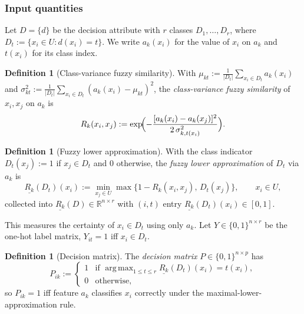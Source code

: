 \documentclass[]{interact}
\theoremstyle{plain}
\theoremstyle{definition}
\newtheorem{definition}[theorem]{Definition}
\theoremstyle{remark}
\newcommand{\R}{\mathbb{R}}
\DeclareMathOperator*{\argmax}{arg\,max}
\begin{document}
\subsubsection{Input quantities}\label{sssec:afrsfcv-inputs}
Let $D=\{d\}$ be the decision attribute with $r$ classes $D_1,\dots,D_r$, where $D_t:=\{x_i\in U:d(x_i)=t\}$. We write $a_k(x_i)$ for the value of $x_i$ on $a_k$ and $t(x_i)$ for its class index.
\begin{definition}[Class-variance fuzzy similarity]\label{def:sim-rel}
With $\mu_{kt}:=\tfrac1{|D_t|}\sum_{x_i\in D_t}a_k(x_i)$ and $\sigma_{kt}^2:=\tfrac1{|D_t|}\sum_{x_i\in D_t}(a_k(x_i)-\mu_{kt})^2$, the \emph{class-variance fuzzy similarity} of $x_i,x_j$ on $a_k$ is
\begin{equation}\label{eq:simRel}
R_k(x_i,x_j):=\exp\!\Bigl(-\frac{[a_k(x_i)-a_k(x_j)]^2}{2\,\sigma_{k,t(x_i)}^2}\Bigr).
\end{equation}
\end{definition}
\begin{definition}[Fuzzy lower approximation]\label{def:lower}
With the class indicator $D_t(x_j):=1$ if $x_j\in D_t$ and $0$ otherwise, the \emph{fuzzy lower approximation} of $D_t$ via $a_k$ is
\begin{equation}\label{eq:lower}
\underline{R_k}(D_t)(x_i):=\min_{x_j\in U}\max\{1-R_k(x_i,x_j),\,D_t(x_j)\},\qquad x_i\in U,
\end{equation}
collected into $\underline{R_k}(D)\in\R^{n\times r}$ with $(i,t)$ entry $\underline{R_k}(D_t)(x_i)\in[0,1]$.
\end{definition}
This measures the certainty of $x_i\in D_t$ using only $a_k$. Let $Y\in\{0,1\}^{n\times r}$ be the one-hot label matrix, $Y_{it}=1$ iff $x_i\in D_t$.
\begin{definition}[Decision matrix]\label{def:Pmat}
The \emph{decision matrix} $P\in\{0,1\}^{n\times p}$ has
\begin{equation}\label{eq:Pmat}
P_{ik}:=\begin{cases}1 & \text{if }\argmax_{1\le t\le r}\underline{R_k}(D_t)(x_i)=t(x_i),\\ 0 & \text{otherwise,}\end{cases}
\end{equation}
so $P_{ik}=1$ iff feature $a_k$ classifies $x_i$ correctly under the maximal-lower-approximation rule.
\end{definition}
\end{document}
